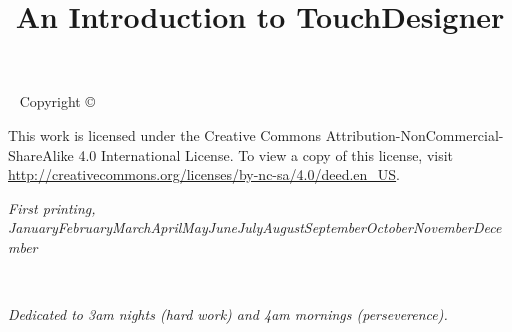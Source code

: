 \documentclass[notoc]{tufte-book} %
\title{An Introduction to TouchDesigner} %
\author{} %
\newcommand{\monthyear}{\ifcase\month\or January\or February\or March\or April\or May\or June\or July\or August\or September\or October\or November\or December\fi\space\number\year} %
\begin{document}
\frontmatter



\maketitle %


\newpage
\begin{fullwidth}
~\vfill
\thispagestyle{empty}
\setlength{\parindent}{0pt}
\setlength{\parskip}{\baselineskip}
Copyright \copyright\ \the\year\ \thanklessauthor

\par{}

\par{}

\par This work is licensed under the Creative Commons Attribution-NonCommercial-ShareAlike 4.0 International License. To view a copy of this license, visit \url{http://creativecommons.org/licenses/by-nc-sa/4.0/deed.en_US}.

\par\textit{First printing, \monthyear}
\end{fullwidth}


\tableofcontents %



\cleardoublepage
~\vfill
\begin{doublespace}
\noindent\fontsize{18}{22}\selectfont\itshape
\nohyphenation
Dedicated to 3am nights (hard work) and 4am mornings (perseverence).
\end{doublespace}
\vfill
\vfill

\end{document}
